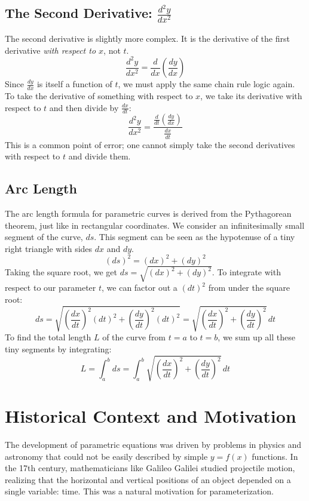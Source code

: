 \documentclass{article}
\begin{document}
\subsection{The Second Derivative: $\frac{d^2y}{dx^2}$}
The second derivative is slightly more complex. It is the derivative of the first derivative \textit{with respect to $x$}, not $t$.
\[ \frac{d^2y}{dx^2} = \frac{d}{dx} \left( \frac{dy}{dx} \right) \]
Since $\frac{dy}{dx}$ is itself a function of $t$, we must apply the same chain rule logic again. To take the derivative of something with respect to $x$, we take its derivative with respect to $t$ and then divide by $\frac{dx}{dt}$:
\[ \frac{d^2y}{dx^2} = \frac{\frac{d}{dt} \left( \frac{dy}{dx} \right)}{\frac{dx}{dt}} \]
This is a common point of error; one cannot simply take the second derivatives with respect to $t$ and divide them.

\subsection{Arc Length}
The arc length formula for parametric curves is derived from the Pythagorean theorem, just like in rectangular coordinates. We consider an infinitesimally small segment of the curve, $ds$. This segment can be seen as the hypotenuse of a tiny right triangle with sides $dx$ and $dy$.
\[ (ds)^2 = (dx)^2 + (dy)^2 \]
Taking the square root, we get $ds = \sqrt{(dx)^2 + (dy)^2}$. To integrate with respect to our parameter $t$, we can factor out a $(dt)^2$ from under the square root:
\[ ds = \sqrt{\left(\frac{dx}{dt}\right)^2 (dt)^2 + \left(\frac{dy}{dt}\right)^2 (dt)^2} = \sqrt{\left(\frac{dx}{dt}\right)^2 + \left(\frac{dy}{dt}\right)^2} \, dt \]
To find the total length $L$ of the curve from $t=a$ to $t=b$, we sum up all these tiny segments by integrating:
\[ L = \int_{a}^{b} ds = \int_{a}^{b} \sqrt{\left(\frac{dx}{dt}\right)^2 + \left(\frac{dy}{dt}\right)^2} \, dt \]

\section{Historical Context and Motivation}
The development of parametric equations was driven by problems in physics and astronomy that could not be easily described by simple $y=f(x)$ functions. In the 17th century, mathematicians like Galileo Galilei studied projectile motion, realizing that the horizontal and vertical positions of an object depended on a single variable: time. This was a natural motivation for parameterization.
\end{document}
